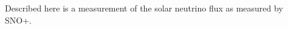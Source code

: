 

\begin{abstracts}
Described here is a measurement of the solar neutrino flux as measured by
SNO+.
\end{abstracts}

